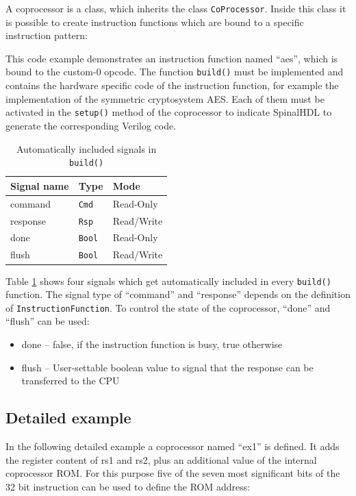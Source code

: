 \documentclass[twoside,twocolumn]{article}
\newcommand{\code}[1]{\texttt{#1}}
\begin{document}
A coprocessor is a class, which inherits the class
\code{CoProcessor}.
Inside this class it is possible to create instruction functions which are
bound to a specific instruction pattern:


This code example demonstrates an instruction function named ``aes'', which
is bound to the custom-0 opcode. The function \code{build()} must be
implemented and contains the hardware specific code of the instruction
function, for example the implementation of the symmetric cryptosystem
AES. Each of them must be activated in the \code{setup()} method 
of the coprocessor to indicate SpinalHDL to generate the corresponding
Verilog code.

\begin{table}[h]
\centering
\begin{tabular}{lll}
    Signal name & Type & Mode \\
    \hline
    command & \code{Cmd} & Read-Only \\
    response & \code{Rsp} & Read/Write\\
    done & \code{Bool} & Read-Only\\
    flush & \code{Bool} & Read/Write
\end{tabular}
    \caption{Automatically included signals in \code{build()}}
    \label{tab:signals}
\end{table}
\noindent Table \ref*{tab:signals} shows four signals which get automatically
included in every \code{build()} function. The signal type of
``command''
and ``response'' depends on the definition of
\code{InstructionFunction}. To control the state of the coprocessor,
``done'' and ``flush'' can be used:
\begin{itemize}
    \item done -- false, if the instruction function is busy, true
        otherwise
    \item flush -- User-settable boolean value to signal that the response
        can be transferred to the CPU
\end{itemize}

\subsection{Detailed example}
In the following detailed example a coprocessor named ``ex1'' is
defined. It adds the register content of rs1 and rs2, plus an additional
value of the internal coprocessor ROM. For this purpose five of the
seven most significant bits of the 32 bit instruction can be used to
define the ROM address:

\end{document}
